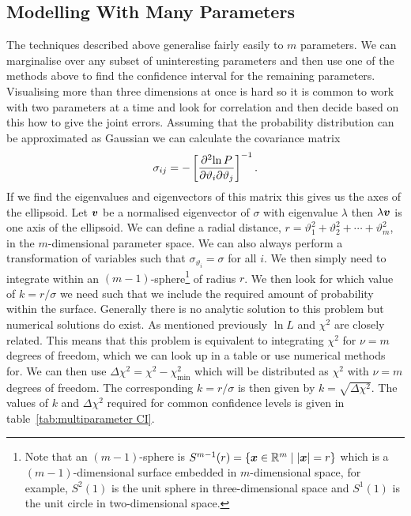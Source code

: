 \documentclass[a4paper]{article}
\newcommand{\st}{\mid}
\begin{document}
    \subsection{Modelling With Many Parameters}
    The techniques described above generalise fairly easily to \(m\) parameters.
    We can marginalise over any subset of uninteresting parameters and then use one of the methods above to find the confidence interval for the remaining parameters.
    Visualising more than three dimensions at once is hard so it is common to work with two parameters at a time and  look for correlation and then decide based on this how to give the joint errors.
    Assuming that the probability distribution can be approximated as Gaussian we can calculate the covariance matrix
    \[\sigma_{ij} = -\left[\frac{\partial^2{\ln P}}{\partial{\vartheta_i}\partial{\vartheta_j}}\right]^{-1}.\]
    If we find the eigenvalues and eigenvectors of this matrix this gives us the axes of the ellipsoid.
    Let \(\bm{v}\) be a normalised eigenvector of \(\sigma\) with eigenvalue \(\lambda\) then \(\lambda\bm{v}\) is one axis of the ellipsoid.
    We can define a radial distance, \(r = \vartheta_1^2 + \vartheta_2^2 + \dotsb + \vartheta_m^2\), in the \(m\)-dimensional parameter space.
    We can also always perform a transformation of variables such that \(\sigma_{\vartheta_i} = \sigma\) for all \(i\).
    We then simply need to integrate within an \((m-1)\)-sphere\footnote{Note that an \((m-1)\)-sphere is \(S^{m-1}(r) = \{\vv{x}\in\reals^{m}\st \abs{\vv{x}} = r\}\) which is a \((m-1)\)-dimensional surface embedded in \(m\)-dimensional space, for example, \(S^2(1)\) is the unit sphere in three-dimensional space and \(S^1(1)\) is the unit circle in two-dimensional space.} of radius \(r\).
    We then look for which value of \(k = r/\sigma\) we need such that we include the required amount of probability within the surface.
    Generally there is no analytic solution to this problem but numerical solutions do exist.
    As mentioned previously \(\ln L\) and \(\chi^2\) are closely related.
    This means that this problem is equivalent to integrating \(\chi^2\) for \(\nu = m\) degrees of freedom, which we can look up in a table or use numerical methods for.
    We can then use \(\Delta\chi^2 = \chi^2 - \chi^2_{\min}\) which will be distributed as \(\chi^2\) with \(\nu = m\) degrees of freedom.
    The corresponding \(k = r/\sigma\) is then given by \(k = \sqrt{\Delta\chi^2}\).
    The values of \(k\) and \(\Delta\chi^2\) required for common confidence levels is given in table~\ref{tab:multiparameter CI}.
\end{document}
